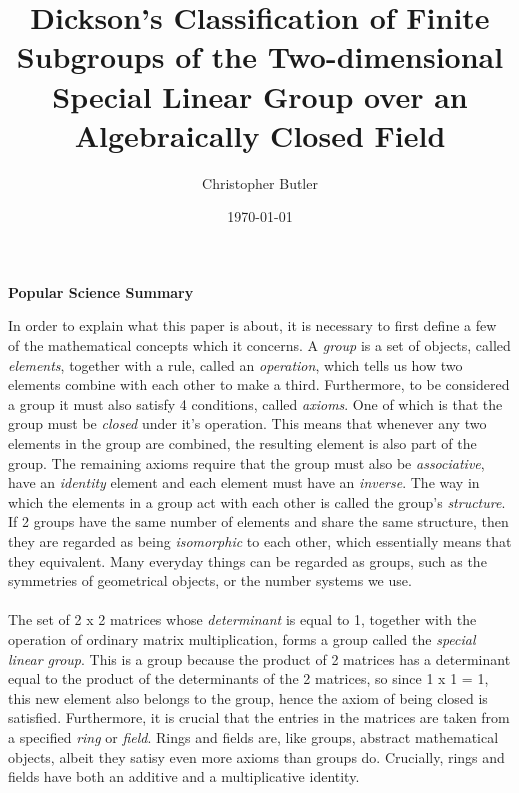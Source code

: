 \documentclass[a4paper , 11pt]{book}
\theoremstyle{definition}
\theoremstyle{remark}
\begin{document}
\frontmatter
\title{Dickson's Classification of Finite Subgroups of the Two-dimensional Special Linear Group over an Algebraically Closed Field}
\author{Christopher Butler}
\date{\today}
\maketitle

\cleardoublepage
\begin{center}
       \Large \textbf{Popular Science Summary}
\end{center}

In order to explain what this paper is about, it is necessary to first define a few of the mathematical concepts which it concerns. A \textit{group} is a set of objects, called \textit{elements}, together with a rule, called an \textit{operation}, which tells us how two elements combine with each other to make a third. Furthermore, to be considered a group it must also satisfy 4 conditions, called \textit{axioms}. One of which is that the group must be \textit{closed} under it's operation. This means that whenever any two elements in the group are combined, the resulting element is also part of the group. The remaining axioms require that the group must also be \textit{associative}, have an \textit{identity} element and each element must have an \textit{inverse}. The way in which the elements in a group act with each other is called the group's \textit{structure}. If 2 groups have the same number of elements and share the same structure, then they are regarded as being \textit{isomorphic} to each other, which essentially means that they equivalent. Many everyday things can be regarded as groups, such as the symmetries of geometrical objects, or the number systems we use. \\
\\
The set of 2 x 2 matrices whose \textit{determinant} is equal to 1, together with the operation of ordinary matrix multiplication, forms a group called the \textit{special linear group}. This is a group because the product of 2 matrices has a determinant equal to the product of the determinants of the 2 matrices, so since 1 x 1 = 1, this new element also belongs to the group, hence the axiom of being closed is satisfied. Furthermore, it is crucial that the entries in the matrices are taken from a specified \textit{ring} or \textit{field}. Rings and fields are, like groups, abstract mathematical objects, albeit they satisy even more axioms than groups do. Crucially, rings and fields have both an additive and a multiplicative identity. \\
\end{document}
